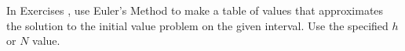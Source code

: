 {\noindent In Exercises}
{, use Euler's Method to make a table of values that approximates the solution to the initial value problem on the given interval.  Use the specified $h$ or $N$ value.}
